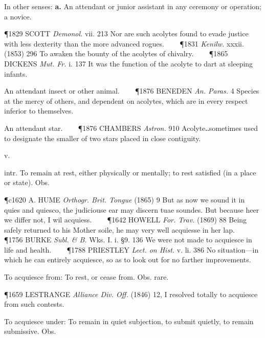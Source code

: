 \begin{description}[wide, labelwidth=!, labelindent=0pt]
\begin{myenumerate}
 In other senses: \textbf{a.} An attendant or junior assistant in any ceremony or operation; a novice. 

\P 1829 SCOTT \textit{Demonol.} vii. 213 Nor are such acolytes found to evade justice with less dexterity than the more advanced rogues.    
\P 1831 \textit{Kenilw.} xxxii. (1853) 296 To awaken the bounty of the acolytes of chivalry.    
\P 1865 DICKENS \textit{Mut. Fr.} i. 137 It was the function of the acolyte to dart at sleeping infants.

 An attendant insect or other animal. 
   
\P 1876 BENEDEN \textit{An. Paras.} 4 Species at the mercy of others, and dependent on acolytes, which are in every respect inferior to themselves.

 An attendant star. 
   
\P 1876 CHAMBERS \textit{Astron.} 910 Acolyte‥sometimes used to designate the smaller of two stars placed in close contiguity.
\end{myenumerate}

  v.

\noindent  {}

\noindent  
[a. MFr. acquiesce-r (16th c. in Littré), f. L. acquiēsc-ĕre; f. ac- = ad- to, at + quiēsc-ĕre to rest.] 
\vspace{-0.3cm}

\begin{myenumerate}
 intr. To remain at rest, either physically or mentally; to rest satisfied (in a place or state). Obs. 

\P c1620 A. HUME \textit{Orthogr. Brit. Tongue} (1865) 9 But as now we sound it in quies and quiesco, the judiciouse ear may discern tuae soundes. But because heer we differ not, I wil acquiess.    
\P 1642 HOWELL \textit{For. Trav.} (1869) 88 Being safely returned to his Mother soile, he may very well acquiesse in her lap.    
\P 1756 BURKE \textit{Subl. \& B.} Wks. I. i. §9. 136 We were not made to acquiesce in life and health.    
\P 1788 PRIESTLEY \textit{Lect. on Hist.} v. li. 386 No situation—in which he can entirely acquiesce, so as to look out for no farther improvements.

 To acquiesce from: To rest, or cease from. Obs. rare. 

\P 1659 LESTRANGE \textit{Alliance Div. Off.} (1846) 12, I resolved totally to acquiesce from such contests.

 To acquiesce under: To remain in quiet subjection, to submit quietly, to remain submissive. Obs. 


\end{myenumerate}
\end{description}
